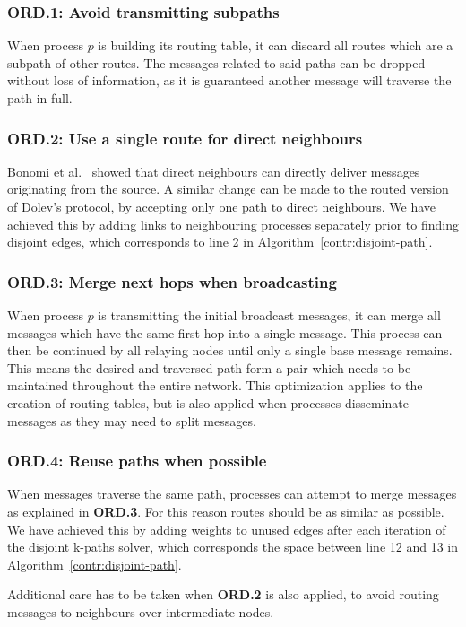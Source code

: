 \subsubsection{ORD.1: Avoid transmitting subpaths}
When process $p$ is building its routing table, it can discard all routes which are a subpath of other routes. The messages related to said paths can be dropped without loss of information, as it is guaranteed another message will traverse the path in full.

\subsubsection{ORD.2: Use a single route for direct neighbours}
Bonomi et al.~\cite{bonomi2019multihop} showed that direct neighbours can directly deliver messages originating from the source. A similar change can be made to the routed version of Dolev's protocol, by accepting only one path to direct neighbours. We have achieved this by adding links to neighbouring processes separately prior to finding disjoint edges, which corresponds to line 2 in Algorithm~\ref{contr:disjoint-path}.

\subsubsection{ORD.3: Merge next hops when broadcasting}
When process $p$ is transmitting the initial broadcast messages, it can merge all messages which have the same first hop into a single message. This process can then be continued by all relaying nodes until only a single base message remains. This means the desired and traversed path form a pair which needs to be maintained throughout the entire network. This optimization applies to the creation of routing tables, but is also applied when processes disseminate messages as they may need to split messages.

\subsubsection{ORD.4: Reuse paths when possible}
When messages traverse the same path, processes can attempt to merge messages as explained in \textbf{ORD.3}. For this reason routes should be as similar as possible. We have achieved this by adding weights to unused edges after each iteration of the disjoint k-paths solver, which corresponds the space between line 12 and 13 in Algorithm~\ref{contr:disjoint-path}.

Additional care has to be taken when \textbf{ORD.2} is also applied, to avoid routing messages to neighbours over intermediate nodes.

